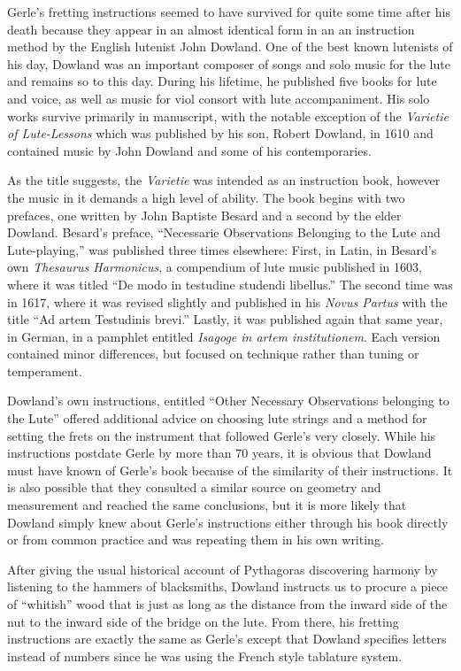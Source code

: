 Gerle's fretting instructions seemed to have survived for quite some time after his death because they appear in an
almost identical form in an an instruction method by the English lutenist John Dowland. One of the best known lutenists
of his day, Dowland was an important composer of songs and solo music for the lute and remains so to this day. During
his lifetime, he published five books for lute and voice, as well as music for viol consort with lute accompaniment.
His solo works survive primarily in manuscript, with the notable exception of the \textit{Varietie of Lute-Lessons}
which was published by his son, Robert Dowland, in 1610 and contained music by John Dowland and some of his
contemporaries.

As the title suggests, the \textit{Varietie} was intended as an instruction book, however the music in it demands a high
level of ability. The book begins with two prefaces, one written by John Baptiste Besard and a second by the elder
Dowland. Besard's preface, ``Necessarie Observations Belonging to the Lute and Lute-playing,'' was published three times
elsewhere: First, in Latin, in Besard's own \textit{Thesaurus Harmonicus}, a compendium of lute music published in 1603,
where it was titled ``De modo in testudine studendi libellus.'' The second time was in 1617, where it was revised
slightly and published in his \textit{Novus Partus} with the title ``Ad artem Testudinis brevi.'' Lastly, it was
published again that same year, in German, in a pamphlet entitled \textit{Isagoge in artem institutionem}. Each version
contained minor differences, but focused on technique rather than tuning or temperament.

Dowland's own instructions, entitled ``Other Necessary Observations belonging to the Lute'' offered additional advice on
choosing lute strings and a method for setting the frets on the instrument that followed Gerle's very closely. While his
instructions postdate Gerle by more than 70 years, it is obvious that Dowland must have known of Gerle's book because of
the similarity of their instructions. It is also possible that they consulted a similar source on geometry and
measurement and reached the same conclusions, but it is more likely that Dowland simply knew about Gerle's instructions
either through his book directly or from common practice and was repeating them in his own writing.

After giving the usual historical account of Pythagoras discovering harmony by listening to the hammers of blacksmiths,
Dowland instructs us to procure a piece of ``whitish'' wood that is just as long as the distance from the inward side of
the nut to the inward side of the bridge on the lute. From there, his fretting instructions are exactly the same as
Gerle's except that Dowland specifies letters instead of numbers since he was using the French style tablature system.

